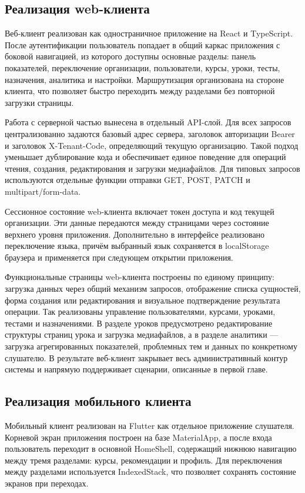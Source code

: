 \subsection{Реализация web-клиента}

Веб-клиент реализован как одностраничное приложение на React и TypeScript. После аутентификации пользователь попадает в общий каркас приложения с боковой навигацией, из которого доступны основные разделы: панель показателей, переключение организации, пользователи, курсы, уроки, тесты, назначения, аналитика и настройки. Маршрутизация организована на стороне клиента, что позволяет быстро переходить между разделами без повторной загрузки страницы.

Работа с серверной частью вынесена в отдельный API-слой. Для всех запросов централизованно задаются базовый адрес сервера, заголовок авторизации Bearer и заголовок X-Tenant-Code, определяющий текущую организацию. Такой подход уменьшает дублирование кода и обеспечивает единое поведение для операций чтения, создания, редактирования и загрузки медиафайлов. Для типовых запросов используются отдельные функции отправки GET, POST, PATCH и multipart/form-data.

Сессионное состояние web-клиента включает токен доступа и код текущей организации. Эти данные передаются между страницами через состояние верхнего уровня приложения. Дополнительно в интерфейсе реализовано переключение языка, причём выбранный язык сохраняется в localStorage браузера и применяется при следующем открытии приложения.

Функциональные страницы web-клиента построены по единому принципу: загрузка данных через общий механизм запросов, отображение списка сущностей, форма создания или редактирования и визуальное подтверждение результата операции. Так реализованы управление пользователями, курсами, уроками, тестами и назначениями. В разделе уроков предусмотрено редактирование структуры страниц урока и загрузка медиафайлов, а в разделе аналитики --- загрузка агрегированных показателей, проблемных тем и данных по конкретному слушателю. В результате веб-клиент закрывает весь административный контур системы и напрямую поддерживает сценарии, описанные в первой главе.

\subsection{Реализация мобильного клиента}

Мобильный клиент реализован на Flutter как отдельное приложение слушателя. Корневой экран приложения построен на базе MaterialApp, а после входа пользователь переходит в основной HomeShell, содержащий нижнюю навигацию между тремя разделами: курсы, рекомендации и профиль. Для переключения между разделами используется IndexedStack, что позволяет сохранять состояние экранов при переходах.


